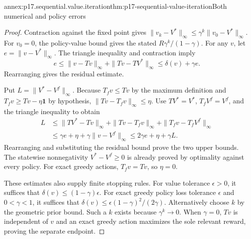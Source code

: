 \begin{annexitem}{annex:p17.sequential.value.iteration}{thm:p17-sequential-value-iteration}{Both numerical and policy errors}
\begin{proof}
Contraction against the fixed point gives
\(\|v_k-V^*\|_\infty\leq\gamma^k\|v_0-V^*\|_\infty\).
For \(v_0=0\), the policy-value bound gives the
stated \(R\gamma^k/(1-\gamma)\).
For any \(v\), let \(e=\|v-V^*\|_\infty\).
The triangle inequality and contraction imply
\[
 e\leq\|v-Tv\|_\infty+\|Tv-TV^*\|_\infty
                      \leq\delta(v)+\gamma e.
\]
Rearranging gives the residual estimate.

Put \(L=\|V^*-V^f\|_\infty\).
Because \(T_fv\leq Tv\) by the maximum definition
and \(T_fv\geq Tv-\eta\mathbf1\) by hypothesis,
\(\|Tv-T_fv\|_\infty\leq\eta\).
Use \(TV^*=V^*\), \(T_fV^f=V^f\), and the
triangle inequality to obtain
\[
\begin{split}
 L&\leq\|TV^*-Tv\|_\infty+\|Tv-T_fv\|_\infty
                                    +\|T_fv-T_fV^f\|_\infty\\
  &\leq\gamma e+\eta+\gamma\|v-V^f\|_\infty
   \leq2\gamma e+\eta+\gamma L.
\end{split}
\]
Rearranging and substituting the residual bound
prove the two upper bounds. The statewise
nonnegativity \(V^*-V^f\geq0\) is already proved
by optimality against every policy.
For exact greedy actions, \(T_fv=Tv\), so
\(\eta=0\).

These estimates also supply finite stopping rules.
For value tolerance \(\epsilon>0\), it suffices
that \(\delta(v)\leq(1-\gamma)\epsilon\).
For exact greedy policy loss tolerance \(\epsilon\)
and \(0<\gamma<1\), it suffices that
\(\delta(v)\leq\epsilon(1-\gamma)^2/(2\gamma)\).
Alternatively choose \(k\) by the geometric
prior bound. Such a \(k\) exists because
\(\gamma^k\to0\).
When \(\gamma=0\), \(Tv\) is independent of \(v\)
and an exact greedy action maximizes the sole
relevant reward, proving the separate endpoint.
\end{proof}
\end{annexitem}

